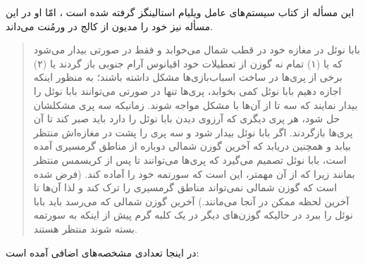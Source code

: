 \documentclass{book}
\begin{document}
    این مسأله از کتاب سیستم‌های عامل ویلیام استالینگز گرفته شده است  \cite{stallings}، امّا او در این مسأله نیز خود را مدیون 
    از کالج   در ورمُنت می‌داند. 


\begin{quotation}
    بابا نوئل در مغازه خود در قطب شمال می‌خوابد و فقط در صورتی بیدار می‌شود که یا (۱) تمام نه گوزن از تعطیلات خود اقیانوس آرام جنوبی باز گردند یا (۲)
    برخی از پری‌ها در ساخت اسباب‌بازی‌ها مشکل داشته باشند؛ به منظور اینکه اجازه دهیم بابا نوئل کمی بخوابد، پری‌ها تنها در صورتی می‌توانند 
    بابا نوئل را بیدار نمایند که سه تا از آن‌ها با مشکل مواجه شوند. زمانیکه سه پری مشکلشان حل شود،‌ هر پری دیگری که آرزوی دیدن بابا نوئل را دارد 
    باید صبر کند تا آن پری‌ها بازگردند. اگر بابا نوئل بیدار شود و سه پری را پشت در مغازه‌اش منتظر بیابد و همچنین دریابد که آخرین گوزن شمالی دوباره  از مناطق 
    گرمسیری آمده است، بابا نوئل تصمیم می‌گیرد که پری‌ها می‌توانند تا پس از کریسمس منتظر بمانند زیرا که از آن مهمتر، این است که سورتمه خود را آماده کند. 
    (فرض شده است که گوزن شمالی نمی‌تواند مناطق گرمسیری را ترک کند و لذا آن‌ها تا آخرین لحظه ممکن در آنجا می‌مانند.)
    آخرین گوزن شمالی که می‌رسد باید بابا نوئل را ببرد در حالیکه گوزن‌های دیگر در یک کلبه گرم پیش از اینکه به سورتمه بسته شوند منتظر هستند. 
\end{quotation}

    در اینجا تعدادی مشخصه‌های اضافی آمده است: 
\end{document}
